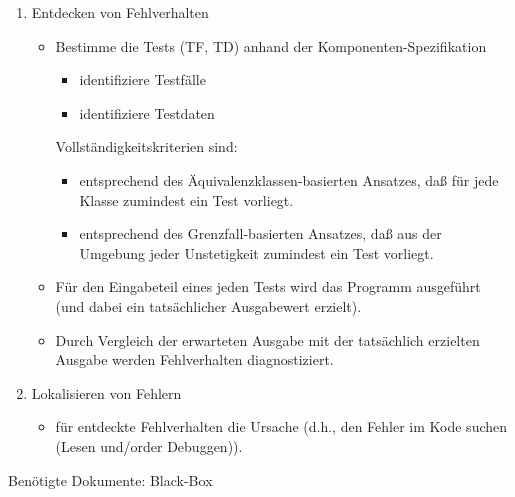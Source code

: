 \begin{enumerate}
\item Entdecken von Fehlverhalten

\begin{itemize}

\item Bestimme die Tests (TF, TD) anhand der Komponenten-Spezifikation
\begin{itemize}
\item identifiziere Testf\"alle
\item identifiziere Testdaten
\end{itemize}

Vollst\"andigkeitskriterien sind:
\begin{itemize}
\item entsprechend des \"Aquivalenzklassen-basierten Ansatzes, da{\ss}
f\"ur jede Klasse zumindest ein Test vorliegt.
\item entsprechend des Grenzfall-basierten Ansatzes, da{\ss} aus der
Umgebung jeder Unstetigkeit zumindest ein Test vorliegt.

\end{itemize}

\item F\"ur den Eingabeteil eines jeden Tests wird das Programm
ausgef\"uhrt (und dabei ein tats\"achlicher Ausgabewert erzielt).

\item Durch Vergleich der erwarteten Ausgabe mit der tats\"achlich
erzielten Ausgabe werden Fehlverhalten diagnostiziert.

\end{itemize} 

\item Lokalisieren von Fehlern
\begin{itemize}
\item f\"ur entdeckte Fehlverhalten die Ursache (d.h., den Fehler im
Kode suchen (Lesen und/order Debuggen)).
\end{itemize}

\end{enumerate}


\newpage
\centerline{Ben\"otigte Dokumente: Black-Box}
\bigskip

